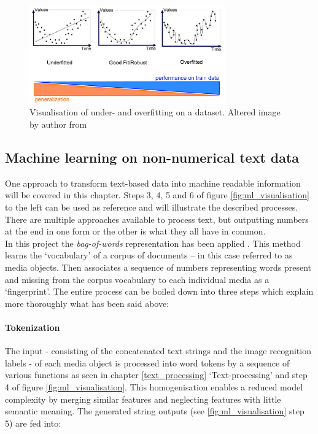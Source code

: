 \begin{figure}[h]
   \centering
   \includegraphics[width=0.75\textwidth]{img/over_underfitting.eps}
   \caption{Visualisation of under- and overfitting on a dataset. Altered image by author from\parencite{Bhande2018WhatIt.}}
   \label{fig:over_underfitting}
\end{figure}

\subsection{Machine learning on non-numerical text data} \label{ml_text_data}

One approach to transform text-based data into machine readable information will be covered in this chapter. Steps 3, 4, 5 and 6 of figure \ref{fig:ml_visualisation} to the left can be used as reference and will illustrate the described processes.\\
There are multiple approaches available to process text, but outputting numbers at the end in one form or the other is what they all have in common.\\
In this project the \textit{bag-of-words} representation has been applied \parencite{Joulin2016BagClassification}. This method learns the ‘vocabulary’ of a corpus of documents – in this case referred to as media objects. Then associates a sequence of numbers representing words present and missing from the corpus vocabulary to each individual media as a ‘fingerprint’. The entire process can be boiled down into three steps which explain more thoroughly what has been said above:

\paragraph{Tokenization} The input - consisting of the concatenated text strings and the image recognition labels - of each media object is processed into word tokens by a sequence of various functions as seen in chapter \ref{text_processing} ‘Text-processing’ and step 4 of figure \ref{fig:ml_visualisation}. This homogenisation enables a reduced model complexity by merging similar features and neglecting features with little semantic meaning. The generated string outputs (see \ref{fig:ml_visualisation} step 5) are fed into:

